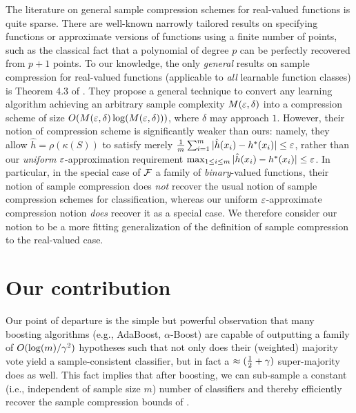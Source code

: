 The literature on general sample compression schemes for real-valued functions is quite sparse. 
There are
well-known
narrowly tailored
results on specifying functions or approximate versions of functions 
using a finite number of points, such as the
classical
fact that a polynomial of degree $p$ can be perfectly 
recovered from $p+1$ points.
To our knowledge, the only \emph{general} results on sample compression for real-valued functions
(applicable to \emph{all} learnable function classes) is Theorem 4.3 of \citet*{david2016supervised}.
They propose a general technique to convert any learning algorithm achieving an arbitrary sample 
complexity $M(\varepsilon,\delta)$ into a compression scheme of size $O(M(\varepsilon,\delta) \log(M(\varepsilon,\delta)))$, 
where $\delta$ may approach $1$.  However, their notion of compression scheme is significantly weaker 
than ours: namely, they allow $\hat{h} = \rho(\kappa(S))$ to satisfy merely $\frac{1}{m} \sum_{i=1}^{m} | \hat{h}(x_i) - h^{*}(x_i) | \leq \varepsilon$, 
rather than our \emph{uniform} $\varepsilon$-approximation requirement $\max_{1 \leq i \leq m} | \hat{h}(x_i) - h^{*}(x_i) | \leq \varepsilon$.
In particular, in the special case of $\mathcal{F}$ a family of \emph{binary}-valued functions, their notion of 
sample compression does \emph{not} recover the usual notion of sample compression schemes for classification, 
whereas our uniform $\varepsilon$-approximate compression notion \emph{does} recover it as a special case.  We therefore 
consider our notion to be a more
fitting
generalization of the definition of sample compression 
to the real-valued case.

    


\section{Our contribution}

\begin{sloppypar}
Our point of departure is the simple but powerful observation
\citep{MR2920188}
that many boosting algorithms (e.g., AdaBoost, $\alpha$-Boost) are capable of outputting 
a family of $O(\log(m)/\gamma^2)$ hypotheses
such that not only does their (weighted) majority vote yield a sample-consistent
classifier, but in fact a $\approx(\frac12+\gamma)$ super-majority does as well.
This fact implies that after boosting, we can sub-sample a constant (i.e., independent of sample size $m$)
number of classifiers and thereby efficiently recover the sample compression bounds
of 
\citet{DBLP:journals/jacm/MoranY16}.
\end{sloppypar}

